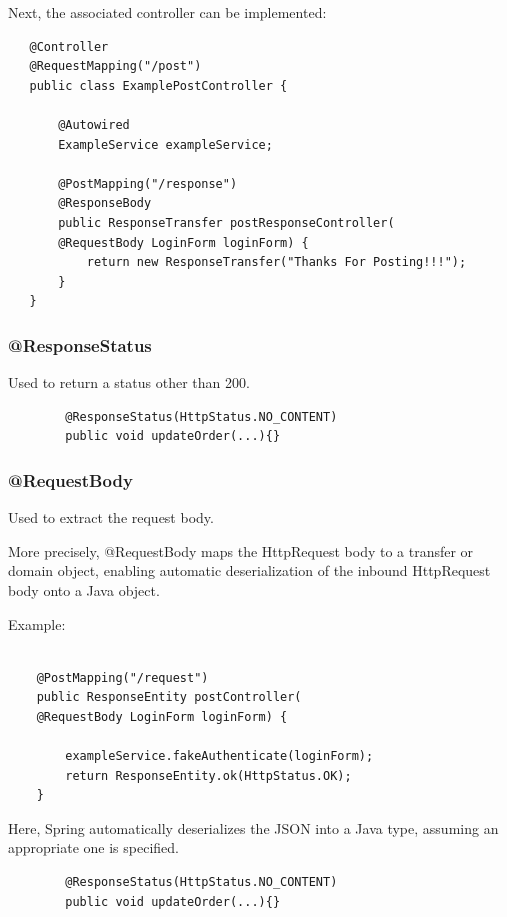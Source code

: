 \documentclass{scrartcl}
\begin{document}
Next, the associated controller can be implemented:

\begin{lstlisting}
   @Controller
   @RequestMapping("/post")
   public class ExamplePostController {

       @Autowired
       ExampleService exampleService;

       @PostMapping("/response")
       @ResponseBody
       public ResponseTransfer postResponseController(
       @RequestBody LoginForm loginForm) {
           return new ResponseTransfer("Thanks For Posting!!!");
       }
   }
\end{lstlisting}

\subsubsection{@ResponseStatus}

    Used to return a status other than 200.

    \begin{lstlisting}
        @ResponseStatus(HttpStatus.NO_CONTENT)
        public void updateOrder(...){}
    \end{lstlisting}

\subsubsection{@RequestBody}

    Used to extract the request body.

    More precisely, @RequestBody maps the HttpRequest body to a transfer or domain object, enabling automatic deserialization of the inbound HttpRequest body onto a Java object.

    Example:

    \begin{lstlisting}

    @PostMapping("/request")
    public ResponseEntity postController(
    @RequestBody LoginForm loginForm) {

        exampleService.fakeAuthenticate(loginForm);
        return ResponseEntity.ok(HttpStatus.OK);
    }

    \end{lstlisting}
    Here, Spring automatically deserializes the JSON into a Java type, assuming an appropriate one is specified.

    \begin{lstlisting}
        @ResponseStatus(HttpStatus.NO_CONTENT)
        public void updateOrder(...){}
    \end{lstlisting}
\end{document}
